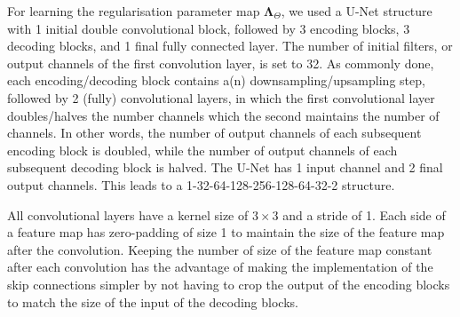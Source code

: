 \documentclass[12pt]{article}
\begin{document}
  





For learning the regularisation parameter map $\mathbf{\Lambda}_{\Theta}$, we used a U-Net structure with 1 initial double convolutional block, followed by 3 encoding blocks, 3 decoding blocks, and 1 final fully connected layer.
The number of initial filters, or output channels of the first convolution layer, is set to 32.
As commonly done, each encoding/decoding block contains a(n) downsampling/upsampling step, followed by 2 (fully) convolutional layers, in which the first convolutional layer doubles/halves the number channels which the second maintains the number of channels.
In other words, the number of output channels of each subsequent encoding block is doubled, while the number of output channels of each subsequent decoding block is halved.
The U-Net has 1 input channel and 2 final output channels.
This leads to a 1-32-64-128-256-128-64-32-2 structure.

All convolutional layers have a kernel size of $3 \times 3$ and a stride of 1.
Each side of a feature map has zero-padding of size 1 to maintain the size of the feature map after the convolution.
Keeping the number of size of the feature map constant after each convolution has the advantage of making the implementation of the skip connections simpler by not having to crop the output of the encoding blocks to match the size of the input of the decoding blocks.
\end{document}
